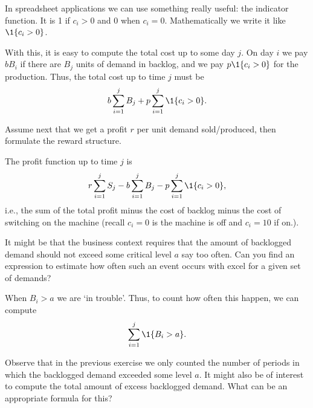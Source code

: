   \begin{solution}
    In spreadsheet applications we can use something really useful: the indicator
    function. It is 1 if $c_i>0$ and $0$ when $c_i=0$. Mathematically
    we write it like $\1{c_i>0}$.  

    With this, it is easy to compute the total cost up to some day
    $j$. On day $i$ we pay $b B_i$ if there are $B_j$ units of demand
    in backlog, and we pay $p \1{c_i>0}$ for the production. Thus, the total cost up to time $j$ must be 
    \begin{equation*}
      b\sum_{i=1}^j B_j + p \sum_{i=1}^j \1{c_i > 0}.
    \end{equation*}

  \end{solution}


\begin{question}
  Assume next that we get a profit $r$ per unit demand sold/produced, then
formulate the reward structure.
\end{question}

  \begin{solution}
    The profit function up to time $j$ is
    \begin{equation*}
     r \sum_{i=1}^j S_j - b \sum_{i=1}^j B_j - p \sum_{i=1}^j \1{c_i>0}, 
    \end{equation*}
    i.e., the sum of the total profit minus the cost of backlog minus
    the cost of switching on the machine (recall $c_i = 0$ is the
    machine is off and $c_i = 10$ if on.).

  \end{solution}


\begin{question}
  It might be that the business context requires that the amount of
  backlogged demand should not exceed some critical level $a$ say too
  often. Can you find an expression to estimate how often such an
  event occurs with excel for a given set of demands?
\end{question}

  \begin{solution}
    When $B_i>a$ we are `in trouble'. Thus, to count how often this happen, we can compute
    \begin{equation*}
      \sum_{i=1}^j \1{B_i > a}.
    \end{equation*}
  \end{solution}


\begin{question}
  Observe that in the previous exercise we only counted the number of
  periods in which the backlogged demand exceeded some level $a$. It
  might also be of interest to compute the total amount of
excess backlogged demand. What can be an appropriate formula for this? 
\end{question}

